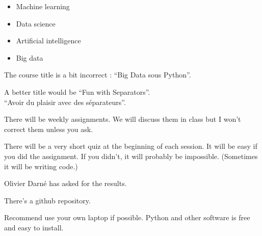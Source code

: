 




\begin{itemize}
\item Machine learning
\item Data science
\item Artificial intelligence
\item Big data
\end{itemize}

The course title is a bit incorrect : ``Big Data sous Python''.

A better title would be ``Fun with Separators''.\\
``Avoir du plaisir avec des séparateurs''.

There will be weekly assignments.  We will discuss them in class but I
won't correct them unless you ask.

There will be a very short quiz at the beginning of each session.  It
will be easy if you did the assignment.  If you didn't, it will
probably be impossible.  (Sometimes it will be writing code.)

Olivier Darné has asked for the results.

\bigskip

There's a github repository.

Recommend use your own laptop if possible.  Python and other software
is free and easy to install.


